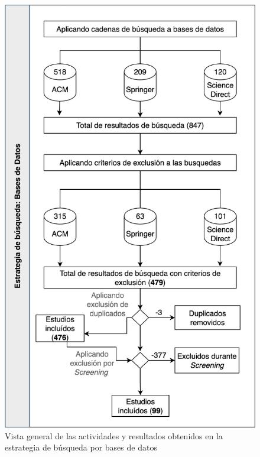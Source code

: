 \begin{figure}[htbp]
	\centering
	\includegraphics[scale=0.25]{resources/figures/overview.png}
	\caption{Vista general de las actividades y resultados obtenidos en la estrategia de búsqueda por bases de datos}
	\label{fig:overview}
\end{figure}


